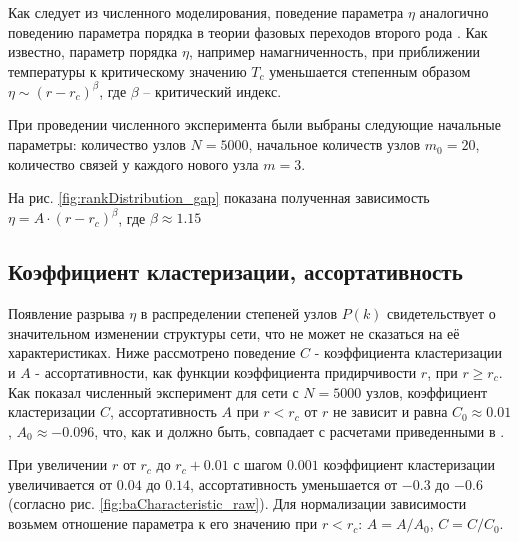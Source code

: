 \documentclass[10pt,aps,pra]{revtex4-1}
\begin{document}
        Как следует из численного моделирования, поведение параметра $\eta$ аналогично поведению параметра порядка в теории фазовых переходов второго рода \cite{Landau}. Как известно, параметр порядка $\eta$, например намагниченность, при приближении температуры к критическому значению $T_c$ уменьшается степенным образом $\eta \sim (r-r_c)^\beta$, где $\beta$ – критический индекс. 

        При проведении численного эксперимента были выбраны следующие начальные параметры: количество узлов $N=5000$, начальное количеств узлов $m_0=20$, количество связей у каждого нового узла $m=3$.

        На рис. \ref{fig:rankDistribution_gap} показана полученная зависимость $\eta = A \cdot {(r-r_c)}^\beta$, где $\beta \approx 1.15$

    \subsection{Коэффициент кластеризации, ассортативность}

        Появление разрыва $\eta$ в распределении степеней узлов $P(k)$ свидетельствует о значительном изменении структуры сети, что не может не сказаться на её характеристиках. Ниже рассмотрено поведение $C$ - коэффициента кластеризации и $A$ - ассортативности, как функции коэффициента придирчивости $r$, при $r \geq r_c$. Как показал численный эксперимент для сети с $N=5000$ узлов, коэффициент кластеризации $C$, ассортативность $A$ при $r<r_c$ от $r$ не зависит и равна $C_0 \approx 0.01$, $A_0 \approx -0.096$, что, как и должно быть, совпадает с расчетами приведенными в \cite{AlBa2,Newman2}. 

        При увеличении $r$ от $r_c$ до $r_c + 0.01$ с шагом $0.001$ коэффициент кластеризации увеличивается от $0.04$ до $0.14$, ассортативность уменьшается от $-0.3$ до $-0.6$(согласно рис. \ref{fig:baCharacteristic_raw}). Для нормализации зависимости возьмем отношение параметра к его значению при $r<r_c$: $A=A/A_0$, $C=C/C_0$.
\end{document}
